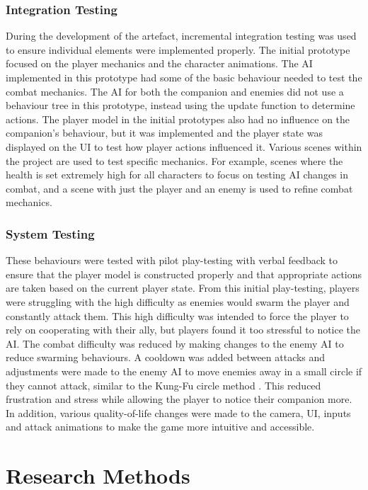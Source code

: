 \documentclass{IEEEtran}
\begin{document}
\subsubsection{Integration Testing}

During the development of the artefact, incremental integration testing was used to ensure individual elements were implemented properly. The initial prototype focused on the player mechanics and the character animations. The AI implemented in this prototype had some of the basic behaviour needed to test the combat mechanics. The AI for both the companion and enemies did not use a behaviour tree in this prototype, instead using the update function to determine actions. The player model in the initial prototypes also had no influence on the companion's behaviour, but it was implemented and the player state was displayed on the UI to test how player actions influenced it. Various scenes within the project are used to test specific mechanics. For example, scenes where the health is set extremely high for all characters to focus on testing AI changes in combat, and a scene with just the player and an enemy is used to refine combat mechanics.

\subsubsection{System Testing}

These behaviours were tested with pilot play-testing with verbal feedback to ensure that the player model is constructed properly and that appropriate actions are taken based on the current player state. From this initial play-testing, players were struggling with the high difficulty as enemies would swarm the player and constantly attack them. This high difficulty was intended to force the player to rely on cooperating with their ally, but players found it too stressful to notice the AI. The combat difficulty was reduced by making changes to the enemy AI to reduce swarming behaviours. A cooldown was added between attacks and adjustments were made to the enemy AI to move enemies away in a small circle if they cannot attack, similar to the Kung-Fu circle method \cite{GAIPKungFuCircle}. This reduced frustration and stress while allowing the player to notice their companion more. In addition, various quality-of-life changes were made to the camera, UI, inputs and attack animations to make the game more intuitive and accessible.

\section{Research Methods}
\label{ResearchMethod}
\end{document}
